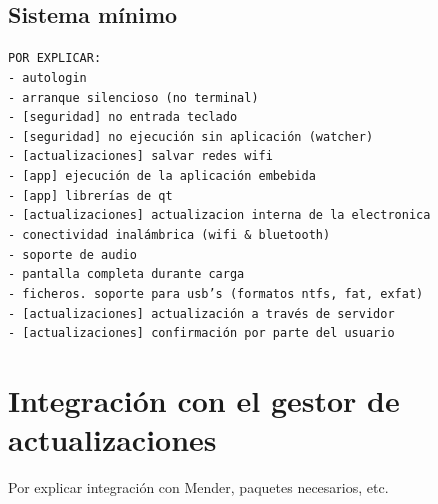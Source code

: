\subsection{Sistema mínimo}


\texttt{POR EXPLICAR:\\
	- autologin\\
	- arranque silencioso (no terminal)\\
	- [seguridad] no entrada teclado\\
	- [seguridad] no ejecución sin aplicación (watcher)\\
	- [actualizaciones] salvar redes wifi\\
	- [app] ejecución de la aplicación embebida\\
	- [app] librerías de qt\\
	- [actualizaciones] actualizacion interna de la electronica\\
	- conectividad inalámbrica (wifi \& bluetooth)\\
	- soporte de audio\\
	- pantalla completa durante carga\\
	- ficheros. soporte para usb's (formatos ntfs, fat, exfat)\\
	- [actualizaciones] actualización a través de servidor\\
	- [actualizaciones] confirmación por parte del usuario}\\

\section{Integración con el gestor de actualizaciones}

Por explicar integración con Mender, paquetes necesarios, etc.

\newpage